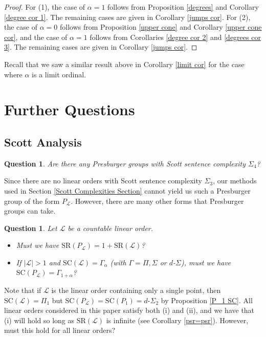 \documentclass{amsart}%
\numberwithin{theorem}{section}
\newtheorem{question}[theorem]{Question}
\newcommand{\0}{\emptyset}
\newcommand{\LL}{\mathcal{L}}
\newcommand{\SR}{\text{SR}}
\newcommand{\SC}{\text{SC}}
\begin{document}
\begin{proof}
    For (1), the case of $\alpha=1$ follows from Proposition \ref{degrees} and Corollary \ref{degree cor 1}. The remaining cases are given in Corollary \ref{jumps cor}. For (2), the case of $\alpha=0$ follows from Proposition \ref{upper cone} and Corollary \ref{upper cone cor}, and the case of $\alpha=1$ follows from Corollaries \ref{degree cor 2} and \ref{degrees cor 3}. The remaining cases are given in Corollary \ref{jumps cor}. 
\end{proof}

Recall that we saw a similar result above in Corollary \ref{limit cor} for the case where $\alpha$ is a limit ordinal. 

\section{Further Questions}
\label{questions}

\subsection{Scott Analysis}

\begin{question}
\label{Q Sigma2/3}
    Are there any Presburger groups with Scott sentence complexity $\Sigma_4$?
\end{question}

Since there are no linear orders with Scott sentence complexity  $\Sigma_3$, our methods used in Section \ref{Scott Complexities Section} cannot yield us such a Presburger group of the form $P_\LL$. However, there are many other forms that Presburger groups can take. 

\begin{question} Let $\LL$ be a countable linear order.
\label{Q SRPL vs SRL}
\begin{itemize}
    \item[(i)] Must we have $\SR(P_\LL)=1+\SR(\LL)$?
    \item[(ii)] If $|\LL|>1$ and $\SC(\LL)=\Gamma_{\alpha}$ (with $\Gamma= \Pi, \Sigma$ or $d$-$\Sigma$), must we have $\SC(P_\LL)=\Gamma_{1+\alpha}$?
\end{itemize}
\end{question}

Note that if $\LL$ is the linear order containing only a single point, then $\SC(\LL)=\Pi_1$ but $\SC(P_\LL)=\SC(P_1)=d$-$\Sigma_2$ by Proposition \ref{P_1 SC}. All linear orders considered in this paper satisfy both (i) and (ii), and we have that (i) will hold so long as $\SR(\LL)$ is infinite (see Corollary \ref{psr=psr}). However, must this hold for all linear orders? 
\end{document}
